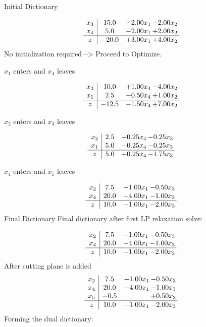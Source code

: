 \documentclass[8pt]{article}
\begin{document}
Initial Dictionary 

\[\begin{array}{c| c c@{\hskip 2pt} c@{\hskip 2pt} }
 x_{3}   &  15.0 & -2.00 x_{1} & -2.00 x_{2}\\
 x_{4}   &  5.0 & -2.00 x_{1} & +  2.00 x_{2}\\
\hline
z    &  -20.0 & +  3.00 x_{1} & +  4.00 x_{2}\\
\end{array}\]
No initialization required --> Proceed to Optimize. 


 $ x_{1} $ enters and $ x_{4} $ leaves 

 \[\begin{array}{c| c c@{\hskip 2pt} c@{\hskip 2pt} }
 x_{3}   &  10.0 & +  1.00 x_{4} & -4.00 x_{2}\\
 x_{1}   &  2.5 & -0.50 x_{4} & +  1.00 x_{2}\\
\hline
z    &  -12.5 & -1.50 x_{4} & +  7.00 x_{2}\\
\end{array}\]


 $ x_{2} $ enters and $ x_{3} $ leaves 

 \[\begin{array}{c| c c@{\hskip 2pt} c@{\hskip 2pt} }
 x_{2}   &  2.5 & +  0.25 x_{4} & -0.25 x_{3}\\
 x_{1}   &  5.0 & -0.25 x_{4} & -0.25 x_{3}\\
\hline
z    &  5.0 & +  0.25 x_{4} & -1.75 x_{3}\\
\end{array}\]


 $ x_{4} $ enters and $ x_{1} $ leaves 

 \[\begin{array}{c| c c@{\hskip 2pt} c@{\hskip 2pt} }
 x_{2}   &  7.5 & -1.00 x_{1} & -0.50 x_{3}\\
 x_{4}   &  20.0 & -4.00 x_{1} & -1.00 x_{3}\\
\hline
z    &  10.0 & -1.00 x_{1} & -2.00 x_{3}\\
\end{array}\]
Final Dictionary
Final dictionary after first LP relaxation solve: 

\[\begin{array}{c| c c@{\hskip 2pt} c@{\hskip 2pt} }
 x_{2}   &  7.5 & -1.00 x_{1} & -0.50 x_{3}\\
 x_{4}   &  20.0 & -4.00 x_{1} & -1.00 x_{3}\\
\hline
z    &  10.0 & -1.00 x_{1} & -2.00 x_{3}\\
\end{array}\]
 After cutting plane is added 
\[\begin{array}{c| c c@{\hskip 2pt} c@{\hskip 2pt} }
 x_{2}   &  7.5 & -1.00 x_{1} & -0.50 x_{3}\\
 x_{4}   &  20.0 & -4.00 x_{1} & -1.00 x_{3}\\
 x_{5}   &  -0.5  &   & +  0.50 x_{3}\\
\hline
z    &  10.0 & -1.00 x_{1} & -2.00 x_{3}\\
\end{array}\]
Forming the dual dictionary:
\end{document}
